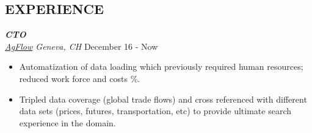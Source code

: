 \documentclass[line, margin]{res}
\begin{document}
\address{Rue de Neuchatel 10, 1201 Geneva, Switzerland \hspace{2.7cm} (+41) 78 926 9917}
\address{\href{mailto:elmas.ferhat@gmail.com}{elmas.ferhat@gmail.com} \hspace{1.2cm} \href{https://ferhatelmas.com}{ferhatelmas.com} \hspace{1.6cm}  \href{https://github.com/ferhatelmas}{github.com/ferhatelmas}}

\begin{resume}

\vspace{-0.4cm}

\section{EXPERIENCE}

{\sl \textbf{CTO} \\ \href{http://www.agflow.com}{AgFlow} Geneva, CH} \hfill December 16 - Now \\
\vspace{-0.3cm}
\begin{itemize}
  \item Automatization of data loading which previously required human resources; reduced work force and costs \%.
  \item Tripled data coverage (global trade flows) and cross referenced with different data sets (prices, futures, transportation, etc) to  provide ultimate search experience in the domain.
\end{itemize}


\end{resume}
\end{document}
